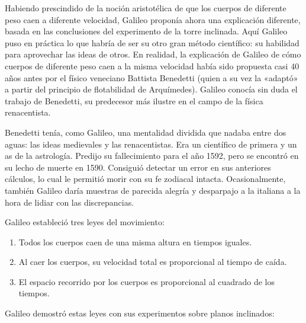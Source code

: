 \documentclass[letterpaper, 10pt, journal]{IEEEtran}
\begin{document}
Habiendo prescindido de la noción aristotélica de que los cuerpos de diferente peso caen a diferente velocidad, Galileo proponía ahora una explicación diferente, basada en las conclusiones del experimento de la torre inclinada. Aquí Galileo puso en práctica lo que habría de ser su otro gran método científico: su habilidad para aprovechar las ideas de otros. En realidad, la explicación de Galileo de cómo cuerpos de diferente peso caen a la misma velocidad había sido propuesta casi 40 años antes por el físico veneciano Battista Benedetti (quien a su vez la «adaptó» a partir del principio de flotabilidad de Arquímedes). Galileo conocía sin duda el trabajo de Benedetti, su predecesor más ilustre en el campo de la física renacentista.

Benedetti tenía, como Galileo, una mentalidad dividida que nadaba entre dos aguas: las ideas medievales y las renacentistas. Era un científico de primera y un as de la astrología. Predijo su fallecimiento para el año 1592, pero se encontró en su lecho de muerte en 1590. Consiguió detectar un error en sus anteriores cálculos, lo cual le permitió morir con su fe zodiacal intacta. Ocasionalmente, también Galileo daría muestras de parecida alegría y desparpajo a la italiana a la hora de lidiar con las discrepancias.

Galileo estableció tres leyes del movimiento:
\begin{enumerate}
\item Todos los cuerpos caen de una misma altura en tiempos iguales.
\item Al caer los cuerpos, su velocidad total es proporcional al tiempo de caída.
\item El espacio recorrido por los cuerpos es proporcional al cuadrado de los tiempos.
\end{enumerate}
Galileo demostró estas leyes con sus experimentos sobre planos inclinados:
\end{document}
